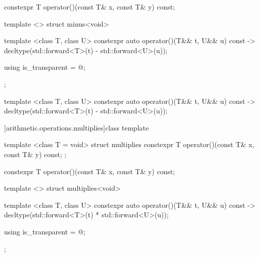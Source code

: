 %
\begin{itemdecl}
constexpr T operator()(const T& x, const T& y) const;
\end{itemdecl}

\begin{itemdescr}
\pnum\returns {}
\end{itemdescr}

%
\begin{itemdecl}
template <> struct minus<void> {
  template <class T, class U> constexpr auto operator()(T&& t, U&& u) const
    -> decltype(std::forward<T>(t) - std::forward<U>(u));

  using is_transparent = @\unspec@;
};
\end{itemdecl}

%
\begin{itemdecl}
template <class T, class U> constexpr auto operator()(T&& t, U&& u) const
    -> decltype(std::forward<T>(t) - std::forward<U>(u));
\end{itemdecl}

\begin{itemdescr}
\pnum\returns {}
\end{itemdescr}

[arithmetic.operations.multiplies]{class template }

%
\begin{itemdecl}
template <class T = void> struct multiplies {
  constexpr T operator()(const T& x, const T& y) const;
};
\end{itemdecl}

%
\begin{itemdecl}
constexpr T operator()(const T& x, const T& y) const;
\end{itemdecl}

\begin{itemdescr}
\pnum\returns {}
\end{itemdescr}

%
\begin{itemdecl}
template <> struct multiplies<void> {
  template <class T, class U> constexpr auto operator()(T&& t, U&& u) const
    -> decltype(std::forward<T>(t) * std::forward<U>(u));

  using is_transparent = @\unspec@;
};
\end{itemdecl}

